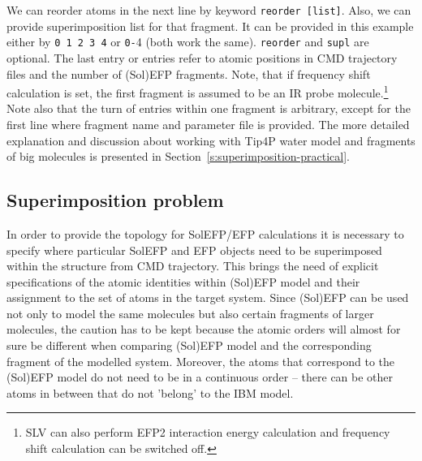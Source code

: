 \documentclass[a4paper,titlepage,twoside,fleqn,12pt]{book}
\begin{document}
\begin{refsection}
We can reorder atoms in the next line
by keyword {\tt reorder [list]}. Also, we can provide 
superimposition list for that fragment. It can be
provided in this example either by {\tt 0 1 2 3 4} 
or {\tt 0-­}4 (both work the same). {\tt reorder} and {\tt supl} are
optional. The last entry or entries refer to atomic positions in CMD trajectory 
files and the number of
(Sol)EFP fragments. Note, that if frequency shift calculation is set, the first fragment
is assumed to be an IR probe molecule.\footnote{SLV can also perform
EFP2 interaction energy calculation and frequency shift calculation
can be switched off.} 
Note also that the turn of entries within one fragment is
arbitrary, except for the first line where fragment name and parameter file is provided. The more
detailed explanation and discussion about working with Tip4P water model and fragments of big
molecules is presented in Section~\ref{s:superimposition-practical}.



\subsection{Superimposition problem\label{s:superimposition-practical}}

In order to provide the topology for SolEFP/EFP calculations it is necessary to specify where particular
SolEFP and EFP objects need to be superimposed within the structure from CMD trajectory. This brings
the need of explicit specifications of the atomic identities within (Sol)EFP model and their
assignment to the set of atoms in the target system. Since (Sol)EFP can be used not only to model
the same molecules but also certain fragments of larger molecules, the caution has to be kept because
the atomic orders will almost for sure be different when comparing (Sol)EFP model and the
corresponding fragment of the modelled system. Moreover, the atoms that correspond to the
(Sol)EFP model do not need to be in a continuous order -- there can be other atoms in between that
do not 'belong' to the IBM model.


\end{refsection}
\end{document}
